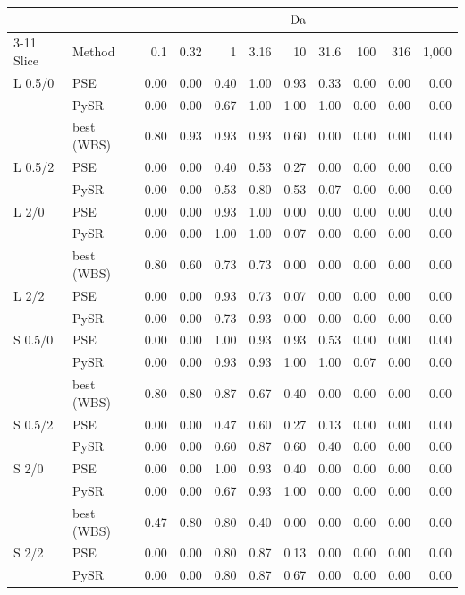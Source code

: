 \begin{center}
\scriptsize
\setlength{\tabcolsep}{3.5pt}
\begin{tabular}{llrrrrrrrrr}
\toprule
& & \multicolumn{9}{c}{$\mathrm{Da}$} \\
\cmidrule(lr){3-11}
Slice & Method & 0.1 & 0.32 & 1 & 3.16 & 10 & 31.6 & 100 & 316 & 1,000 \\
\midrule
L 0.5/0 & PSE & 0.00 & 0.00 & 0.40 & 1.00 & 0.93 & 0.33 & 0.00 & 0.00 & 0.00 \\
 & PySR & 0.00 & 0.00 & 0.67 & 1.00 & 1.00 & 1.00 & 0.00 & 0.00 & 0.00 \\
 & best (WBS) & 0.80 & 0.93 & 0.93 & 0.93 & 0.60 & 0.00 & 0.00 & 0.00 & 0.00 \\
\addlinespace[1pt]
L 0.5/2 & PSE & 0.00 & 0.00 & 0.40 & 0.53 & 0.27 & 0.00 & 0.00 & 0.00 & 0.00 \\
 & PySR & 0.00 & 0.00 & 0.53 & 0.80 & 0.53 & 0.07 & 0.00 & 0.00 & 0.00 \\
\addlinespace[1pt]
L 2/0 & PSE & 0.00 & 0.00 & 0.93 & 1.00 & 0.00 & 0.00 & 0.00 & 0.00 & 0.00 \\
 & PySR & 0.00 & 0.00 & 1.00 & 1.00 & 0.07 & 0.00 & 0.00 & 0.00 & 0.00 \\
 & best (WBS) & 0.80 & 0.60 & 0.73 & 0.73 & 0.00 & 0.00 & 0.00 & 0.00 & 0.00 \\
\addlinespace[1pt]
L 2/2 & PSE & 0.00 & 0.00 & 0.93 & 0.73 & 0.07 & 0.00 & 0.00 & 0.00 & 0.00 \\
 & PySR & 0.00 & 0.00 & 0.73 & 0.93 & 0.00 & 0.00 & 0.00 & 0.00 & 0.00 \\
\addlinespace[1pt]
S 0.5/0 & PSE & 0.00 & 0.00 & 1.00 & 0.93 & 0.93 & 0.53 & 0.00 & 0.00 & 0.00 \\
 & PySR & 0.00 & 0.00 & 0.93 & 0.93 & 1.00 & 1.00 & 0.07 & 0.00 & 0.00 \\
 & best (WBS) & 0.80 & 0.80 & 0.87 & 0.67 & 0.40 & 0.00 & 0.00 & 0.00 & 0.00 \\
\addlinespace[1pt]
S 0.5/2 & PSE & 0.00 & 0.00 & 0.47 & 0.60 & 0.27 & 0.13 & 0.00 & 0.00 & 0.00 \\
 & PySR & 0.00 & 0.00 & 0.60 & 0.87 & 0.60 & 0.40 & 0.00 & 0.00 & 0.00 \\
\addlinespace[1pt]
S 2/0 & PSE & 0.00 & 0.00 & 1.00 & 0.93 & 0.40 & 0.00 & 0.00 & 0.00 & 0.00 \\
 & PySR & 0.00 & 0.00 & 0.67 & 0.93 & 1.00 & 0.00 & 0.00 & 0.00 & 0.00 \\
 & best (WBS) & 0.47 & 0.80 & 0.80 & 0.40 & 0.00 & 0.00 & 0.00 & 0.00 & 0.00 \\
\addlinespace[1pt]
S 2/2 & PSE & 0.00 & 0.00 & 0.80 & 0.87 & 0.13 & 0.00 & 0.00 & 0.00 & 0.00 \\
 & PySR & 0.00 & 0.00 & 0.80 & 0.87 & 0.67 & 0.00 & 0.00 & 0.00 & 0.00 \\
\bottomrule
\end{tabular}
\end{center}
